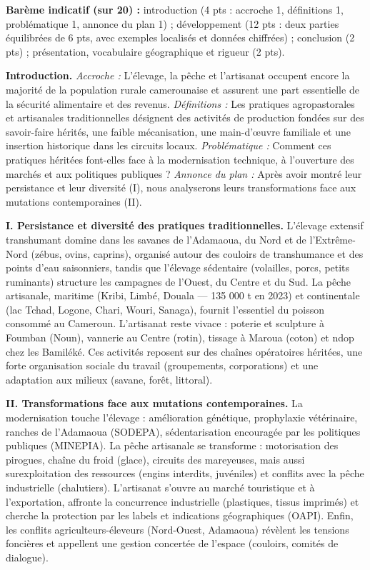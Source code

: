 \documentclass[11pt]{article}
\begin{document}
\begin{corrige}
\textbf{Barème indicatif (sur 20) :} introduction (4 pts : accroche 1, définitions 1, problématique 1, annonce du plan 1) ; développement (12 pts : deux parties équilibrées de 6 pts, avec exemples localisés et données chiffrées) ; conclusion (2 pts) ; présentation, vocabulaire géographique et rigueur (2 pts).

\textbf{Introduction.} \emph{Accroche :} L'élevage, la pêche et l'artisanat occupent encore la majorité de la population rurale camerounaise et assurent une part essentielle de la sécurité alimentaire et des revenus. \emph{Définitions :} Les pratiques agropastorales et artisanales traditionnelles désignent des activités de production fondées sur des savoir-faire hérités, une faible mécanisation, une main-d'œuvre familiale et une insertion historique dans les circuits locaux. \emph{Problématique :} Comment ces pratiques héritées font-elles face à la modernisation technique, à l'ouverture des marchés et aux politiques publiques ? \emph{Annonce du plan :} Après avoir montré leur persistance et leur diversité (I), nous analyserons leurs transformations face aux mutations contemporaines (II).

\textbf{I. Persistance et diversité des pratiques traditionnelles.}
L'élevage extensif transhumant domine dans les savanes de l'Adamaoua, du Nord et de l'Extrême-Nord (zébus, ovins, caprins), organisé autour des couloirs de transhumance et des points d'eau saisonniers, tandis que l'élevage sédentaire (volailles, porcs, petits ruminants) structure les campagnes de l'Ouest, du Centre et du Sud. La pêche artisanale, maritime (Kribi, Limbé, Douala — 135 000 t en 2023) et continentale (lac Tchad, Logone, Chari, Wouri, Sanaga), fournit l'essentiel du poisson consommé au Cameroun. L'artisanat reste vivace : poterie et sculpture à Foumban (Noun), vannerie au Centre (rotin), tissage à Maroua (coton) et ndop chez les Bamiléké. Ces activités reposent sur des chaînes opératoires héritées, une forte organisation sociale du travail (groupements, corporations) et une adaptation aux milieux (savane, forêt, littoral).

\textbf{II. Transformations face aux mutations contemporaines.}
La modernisation touche l'élevage : amélioration génétique, prophylaxie vétérinaire, ranches de l'Adamaoua (SODEPA), sédentarisation encouragée par les politiques publiques (MINEPIA). La pêche artisanale se transforme : motorisation des pirogues, chaîne du froid (glace), circuits des mareyeuses, mais aussi surexploitation des ressources (engins interdits, juvéniles) et conflits avec la pêche industrielle (chalutiers). L'artisanat s'ouvre au marché touristique et à l'exportation, affronte la concurrence industrielle (plastiques, tissus imprimés) et cherche la protection par les labels et indications géographiques (OAPI). Enfin, les conflits agriculteurs-éleveurs (Nord-Ouest, Adamaoua) révèlent les tensions foncières et appellent une gestion concertée de l'espace (couloirs, comités de dialogue).


\end{corrige}
\end{document}
